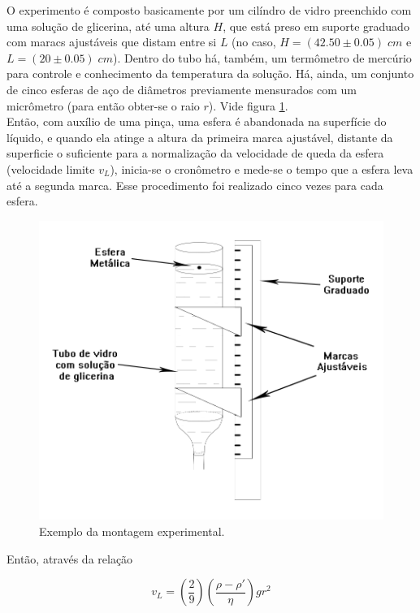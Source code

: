 \documentclass[12pt,a4paper]{article}
\begin{document}
O experimento é composto basicamente por um cilíndro de vidro preenchido com uma solução de glicerina, até uma altura $H$, que está preso em suporte graduado com maracs ajustáveis que distam entre si $L$ (no caso, $H = (42.50 \pm 0.05) \; cm$ e $L = (20 \pm 0.05) \; cm$). Dentro do tubo há, também, um termômetro de mercúrio para controle e conhecimento da temperatura da solução. Há, ainda, um conjunto de cinco esferas de aço de diâmetros previamente mensurados com um micrômetro (para então obter-se o raio $r$). Vide figura \ref{experimento}.\\

Então, com auxílio de uma pinça, uma esfera é abandonada na superfície do líquido, e quando ela atinge a altura da primeira marca ajustável, distante da superficie o suficiente para a normalização da velocidade de queda da esfera (velocidade limite $v_L$), inicia-se o cronômetro e mede-se o tempo que a esfera leva até a segunda marca. Esse procedimento foi realizado cinco vezes para cada esfera.\\

\begin{figure}[!htbp]
\centering
\includegraphics[scale=0.3]{Fig5-1.jpg}
\caption{Exemplo da montagem experimental.}
\label{experimento}
\end{figure}

Então, através da relação

$$v_L = (\frac{2}{9}) (\frac{\rho - \rho'}{\eta}) g r^2$$
\end{document}
